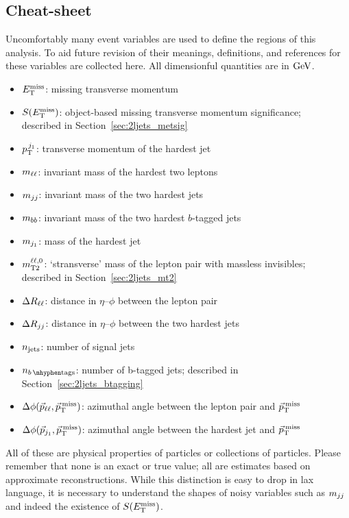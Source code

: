 \subsection{Cheat-sheet}
Uncomfortably many event variables are used to define the regions of this
analysis.
To aid future revision of their meanings, definitions, and references for these
variables are collected here.
All dimensionful quantities are in $\eV[G]$.
\begin{itemize}
\item $\met$: missing transverse momentum
\item $\metsig$: object-based missing transverse momentum significance;\\
described in Section~\ref{sec:2ljets_metsig}
\item $\ptjone$: transverse momentum of the hardest jet%
\vspace{0.5em}
\item $\mll$: invariant mass of the hardest two leptons
\item $\mjj$: invariant mass of the two hardest jets
\item $\mbb$: invariant mass of the two hardest $b$-tagged jets
\item $\mjetone$: mass of the hardest jet
\item $\mttwoll$: `stransverse' mass of the lepton pair with massless invisibles;\\
described in Section~\ref{sec:2ljets_mt2}
\vspace{0.5em}
\item $\rll$: distance in $\eta\textrm{--}\phi$ between the lepton pair
\item $\rjj$: distance in $\eta\textrm{--}\phi$ between the two hardest jets%
\vspace{0.5em}
\item $\njet$: number of signal jets
\item $\nbtag$: number of b-tagged jets;
described in Section~\ref{sec:2ljets_btagging}
\vspace{0.5em}
\item $\dphillmet$: azimuthal angle between the lepton pair and $\ptmiss$
\item $\dphijmet$: azimuthal angle between the hardest jet and $\ptmiss$
\end{itemize}
All of these are physical properties of particles or collections of particles.
Please remember that none is an exact or true value;
all are estimates based on approximate reconstructions.
While this distinction is easy to drop in lax language, it is necessary to
understand the shapes of noisy variables such as $\mjj$ and indeed the
existence of $\metsig$.


